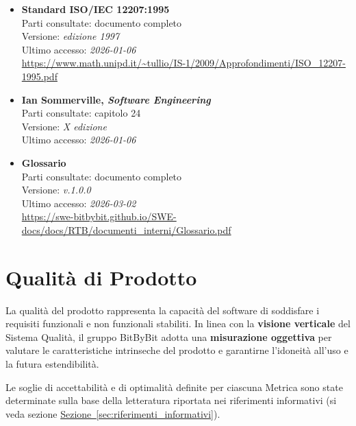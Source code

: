 \documentclass[a4paper,12pt]{article}
\begin{document}
\begin{itemize}
    \item \textbf{Standard ISO/IEC 12207:1995}\\
        Parti consultate: documento completo\\
        Versione: \textit{edizione 1997} \\
        Ultimo accesso: \textit{2026-01-06}\\
        \url{https://www.math.unipd.it/~tullio/IS-1/2009/Approfondimenti/ISO_12207-1995.pdf}
    \item \textbf{Ian Sommerville, \textit{Software Engineering}}\\
        Parti consultate: capitolo 24\\
        Versione: \textit{X edizione}\\
        Ultimo accesso: \textit{2026-01-06}\\
    \item \textbf{Glossario}\\
        Parti consultate: documento completo\\
        Versione: \textit{v.1.0.0}\\
        Ultimo accesso: \textit{2026-03-02}\\
        \url{https://swe-bitbybit.github.io/SWE-docs/docs/RTB/documenti_interni/Glossario.pdf}
\end{itemize}

\section{Qualità di Prodotto}\label{sec:qualità_prodotto}
La qualità del prodotto rappresenta la capacità del software di soddisfare i requisiti funzionali e non funzionali stabiliti. In linea con la \textbf{visione verticale} del Sistema Qualità, il gruppo BitByBit adotta una \textbf{misurazione oggettiva} per valutare le caratteristiche intrinseche del prodotto e garantirne l'idoneità all'uso e la futura estendibilità.

Le soglie di accettabilità e di optimalità definite per ciascuna Metrica sono state determinate sulla base della letteratura riportata nei riferimenti informativi (si veda sezione \hyperref[sec:riferimenti_informativi]{Sezione~\ref*{sec:riferimenti_informativi}}).

\end{document}
